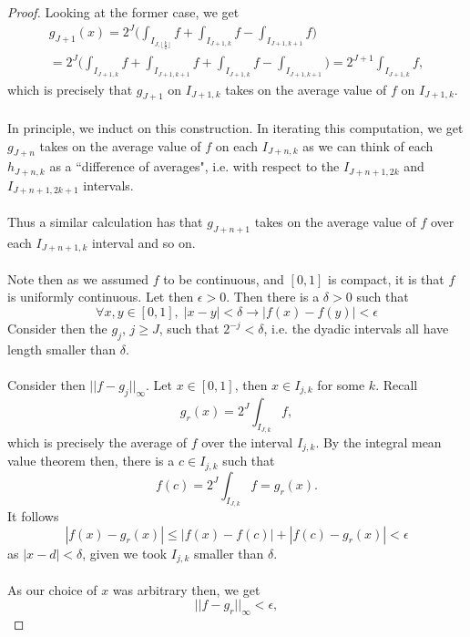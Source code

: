 \documentclass[12pt]{article}
\newenvironment{ex}[2][Exercise]{\begin{trivlist}
\item[\hskip \labelsep {\bfseries #1}\hskip \labelsep {\bfseries #2.}]}{\end{trivlist}}
\begin{document}
\begin{ex}{14}
\begin{enumerate}[label=(\alph*)]
\begin{proof}
            Looking at the former case, we get 
            \begin{align*}g_{J + 1}(x) = 2^J \Big (\int_{I_{J, \lfloor \frac{k}{2} \rfloor}} f + \int_{I_{J + 1, k}} f - \int_{I_{J + 1, k + 1}} f \Big) \\
                 = 2^J \Big (\int_{I_{J + 1, k}} f + \int_{I_{J + 1, k + 1}} f + \int_{I_{J + 1, k}} f - \int_{I_{J + 1, k + 1}} \Big) = 2^{J + 1}\int_{I_{J + 1, k}} f,
            \end{align*}
            which is precisely that $g_{J + 1}$ on $I_{J + 1,k}$ takes on the average value of $f$ on $I_{J + 1, k}$. \\ \\
            In principle, we induct on this construction. In iterating this computation, we get $g_{J + n}$ takes on the average value of $f$ on each $I_{J + n, k}$ as we can think of each $h_{J + n, k}$ as a ``difference of averages", i.e. with respect to the $I_{J + n + 1, 2k}$ and $I_{J + n + 1, 2k + 1}$ intervals. \\ \\
            Thus a similar calculation has that $g_{J + n + 1}$ takes on the average value of $f$ over each $I_{J + n + 1, k}$ interval and so on. \\ \\
            Note then as we assumed $f$ to be continuous, and $[0,1]$ is compact, it is that $f$ is uniformly continuous. Let then $\epsilon > 0$. Then there is a $\delta > 0$ such that 
            $$\forall x, y \in [0,1], \; |x - y| < \delta \longrightarrow |f(x) - f(y)| < \epsilon$$
            Consider then the $g_j$, $j \geq J$, such that $2^{-j} < \delta$, i.e. the dyadic intervals all have length smaller than $\delta$. \\ \\
            Consider then $||f - g_j||_\infty$. Let $x \in [0,1]$, then $x \in I_{j, k}$ for some $k$. Recall
            $$g_r(x) = 2^J \int_{I_{J, k}} f,$$
            which is precisely the average of $f$ over the interval $I_{j,k}$. By the integral mean value theorem then, there is a $c \in I_{j, k}$ such that 
            $$f(c) = 2^J \int_{I_{J, k}} f = g_r(x).$$
            It follows
            $$|f(x) - g_r(x)| \leq |f(x) - f(c)| + |f(c) - g_r(x)| < \epsilon$$
            as $|x - d| < \delta$, given we took $I_{j,k}$ smaller than $\delta$. \\ \\
            As our choice of $x$ was arbitrary then, we get 
            $$||f - g_r||_\infty < \epsilon,$$

\end{proof}
\end{enumerate}
\end{ex}
\end{document}

